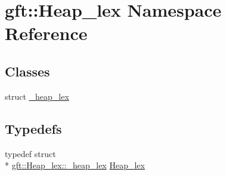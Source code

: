\hypertarget{namespacegft_1_1Heap__lex}{\section{gft\-:\-:Heap\-\_\-lex Namespace Reference}
\label{namespacegft_1_1Heap__lex}
}
\subsection*{Classes}
\begin{DoxyCompactItemize}
\item 
struct \hyperlink{structgft_1_1Heap__lex_1_1__heap__lex}{\-\_\-heap\-\_\-lex}
\end{DoxyCompactItemize}
\subsection*{Typedefs}
\begin{DoxyCompactItemize}
\item 
typedef struct \\*
\hyperlink{structgft_1_1Heap__lex_1_1__heap__lex}{gft\-::\-Heap\-\_\-lex\-::\-\_\-heap\-\_\-lex} \hyperlink{namespacegft_1_1Heap__lex_ad75bb201b66a6623842b22d41ae1d473}{Heap\-\_\-lex}
\end{DoxyCompactItemize}
